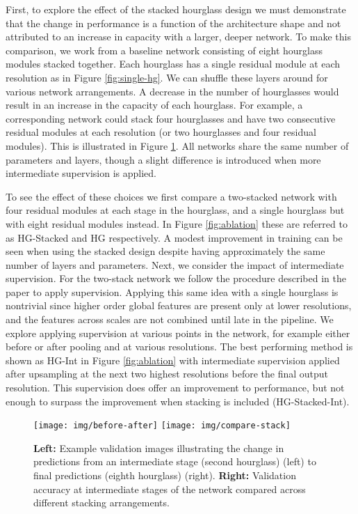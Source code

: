 \documentclass[runningheads]{llncs}
\begin{document}
First, to explore the effect of the stacked hourglass design we must
demonstrate that the change in performance is a function of the
architecture shape and not attributed to an increase in capacity with
a larger, deeper network. To make this comparison, we work from a
baseline network consisting of eight hourglass modules stacked
together. Each hourglass has a single residual module at each
resolution as in Figure \ref{fig:single-hg}. We can shuffle these
layers around for various network arrangements. A decrease in the
number of hourglasses would result in an increase in the capacity of
each hourglass. For example, a corresponding network could stack four
hourglasses and have two consecutive residual modules at each
resolution (or two hourglasses and four residual modules). This is
illustrated in Figure \ref{fig:inter}. All networks share the same
number of parameters and layers, though a slight difference is
introduced when more intermediate supervision is applied.

To see the effect of these choices we first compare a two-stacked
network with four residual modules at each stage in the hourglass, and
a single hourglass but with eight residual modules instead. In Figure
\ref{fig:ablation} these are referred to as HG-Stacked and HG
respectively. A modest improvement in training can be seen when using
the stacked design despite having approximately the same number of
layers and parameters. Next, we consider the impact of intermediate
supervision. For the two-stack network we follow the procedure
described in the paper to apply supervision. Applying this same idea
with a single hourglass is nontrivial since higher order global
features are present only at lower resolutions, and the features
across scales are not combined until late in the pipeline. We explore
applying supervision at various points in the network, for example
either before or after pooling and at various resolutions. The best
performing method is shown as HG-Int in Figure \ref{fig:ablation} with
intermediate supervision applied after upsampling at the next two
highest resolutions before the final output resolution. This
supervision does offer an improvement to performance, but not enough
to surpass the improvement when stacking is included (HG-Stacked-Int).

\begin{figure}[t]
\centering
\texttt{[image: img/before-after]}
\texttt{[image: img/compare-stack]}
\caption{\textbf{Left:} Example validation images illustrating the
  change in predictions from an intermediate stage (second hourglass)
  (left) to final predictions (eighth hourglass)
  (right). \textbf{Right:} Validation accuracy at intermediate stages
  of the network compared across different stacking arrangements.}
\label{fig:inter}
\end{figure}
\end{document}
